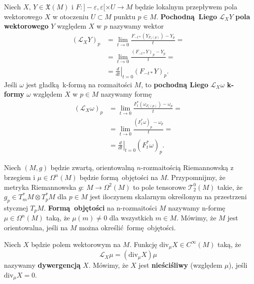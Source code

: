 Niech \(X,\,Y\in\mathfrak{X}(M)\) i \(F:]-\varepsilon, \varepsilon[\times U\rightarrow M\) będzie lokalnym przepływem pola wektorowego \(X\) w otoczeniu \(U\subset M\) punktu \(p\in M\). \textbf{Pochodną Liego} \(\mathcal{L}_X Y\) \textbf{pola wektorowego} \(Y\) względem \(X\) w \(p\) nazywamy wektor
\begin{equation}\label{eq:lie_vector}
\begin{split}
(\mathcal{L}_X Y)_p &= \lim_{t\to 0} \frac{F_{-t\ast}(Y_{F_t(p)})-Y_p}{t} =\\
                    &= \lim_{t\to 0} \frac{(F_{-t\ast}Y)_p - Y_p}{t} =\\
                    &= \left.\frac{d}{dt}\right|_{t = 0}(F_{-t\ast}Y)_p.
\end{split}
\end{equation} 
Jeśli \(\omega\) jest gładką k-formą na rozmaitości \(M\), to \textbf{pochodną Liego} \(\mathcal{L}_X \omega\) \textbf{k-formy} \(\omega\) względem \(X\) w \(p\in M\) nazywamy formę
\begin{equation}\label{eq:lie_form}
\begin{split}
(\mathcal{L}_X \omega)_p &= \lim_{t\to 0}\frac{F_t^{\ast}(\omega_{F_t(p)})-\omega_p}{t} =\\
						 &= \lim_{t\to 0}\frac{(F_t^{\ast}\omega)_p - \omega_p}{t} =\\
						 &= \left.\frac{d}{dt}\right|_{t=0}(F_t^{\ast}\omega)_p.
\end{split}
\end{equation}

Niech \((M, g)\) będzie zwartą, orientowalną \(n\)-rozmaitością Riemannowską z brzegiem i \(\mu \in \Omega^n(M)\) będzie formą objętości na \(M\). Przypomnijmy, że metryka Riemannowska \(g:\: M \rightarrow \Omega^2(M)\) to pole tensorowe \(\mathcal{T}_2^0(M)\) takie, że \(g_p \in T_m^{\ast} M \otimes T_p^{\ast} M\) dla \(p\in M\) jest iloczynem skalarnym określonym na przestrzeni stycznej \(T_p M\). \textbf{Formą objętości} na n-rozmaitości \(M\) nazywamy n-formę \(\mu\in\Omega^n(M)\) taką, że \(\mu(m)\neq 0\) dla wszystkich \(m\in M\). Mówimy, że \(M\) jest orientowalna, jeśli na \(M\) można określić formę objętości. 

Niech \(X\) będzie polem wektorowym na \(M\). Funkcję \(\mathrm{div}_\mu X \in C^\infty(M)\) taką, że 
\begin{equation}
\mathcal{L}_X \mu = (\mathrm{div}_\mu X) \mu
\end{equation}
nazywamy \textbf{dywergencją} \(X\). Mówimy, że \(X\) jest \textbf{nieściśliwy} (względem \(\mu\)), jeśli \(\mathrm{div}_\mu X = 0\).
